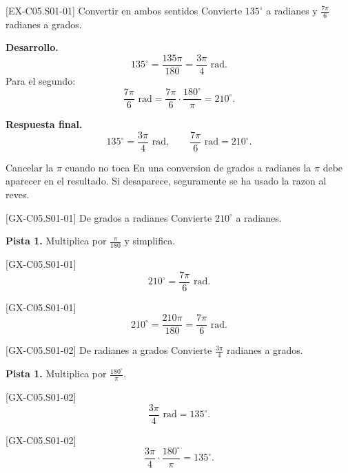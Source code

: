 \begin{solvedexample}{[EX-C05.S01-01] Convertir en ambos sentidos}
Convierte \(135^\circ\) a radianes y \(\frac{7\pi}{6}\) radianes a grados.

\textbf{Desarrollo.}
\[
135^\circ=\frac{135\pi}{180}=\frac{3\pi}{4}\text{ rad}.
\]
Para el segundo:
\[
\frac{7\pi}{6}\text{ rad}=\frac{7\pi}{6}\cdot \frac{180^\circ}{\pi}=210^\circ.
\]

\textbf{Respuesta final.}
\[
135^\circ=\frac{3\pi}{4}\text{ rad},
\qquad
\frac{7\pi}{6}\text{ rad}=210^\circ.
\]
\end{solvedexample}

\begin{commonerror}{Cancelar la \(\pi\) cuando no toca}
En una conversion de grados a radianes la \(\pi\) debe aparecer en el resultado. Si desaparece,
seguramente se ha usado la razon al reves.
\end{commonerror}

\begin{guidedexercise}{[GX-C05.S01-01] De grados a radianes}
Convierte \(210^\circ\) a radianes.

\textbf{Pista 1.} Multiplica por \(\frac{\pi}{180}\) y simplifica.
\end{guidedexercise}

\begin{shortanswer}{[GX-C05.S01-01]}
\[
210^\circ=\frac{7\pi}{6}\text{ rad}.
\]
\end{shortanswer}

\begin{fullsolution}{[GX-C05.S01-01]}
\[
210^\circ=\frac{210\pi}{180}=\frac{7\pi}{6}\text{ rad}.
\]
\end{fullsolution}

\begin{guidedexercise}{[GX-C05.S01-02] De radianes a grados}
Convierte \(\frac{3\pi}{4}\) radianes a grados.

\textbf{Pista 1.} Multiplica por \(\frac{180^\circ}{\pi}\).
\end{guidedexercise}

\begin{shortanswer}{[GX-C05.S01-02]}
\[
\frac{3\pi}{4}\text{ rad}=135^\circ.
\]
\end{shortanswer}

\begin{fullsolution}{[GX-C05.S01-02]}
\[
\frac{3\pi}{4}\cdot \frac{180^\circ}{\pi}=135^\circ.
\]
\end{fullsolution}

